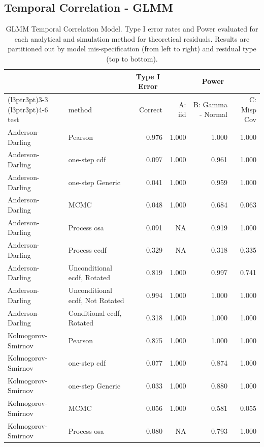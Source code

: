 \documentclass[
]{article}
\begin{document}
\subsection{Temporal Correlation -
GLMM}\label{temporal-correlation---glmm}

\begin{table}[H]
\centering
\caption{\label{tab:randomwalk-results-glmm-theor}GLMM Temporal Correlation Model. Type I error rates and Power evaluated for each analytical and simulation method for theoretical residuals. Results are partitioned out by model mis-specification (from left to right) and residual type (top to bottom).}
\centering
\begin{tabular}[t]{llrrrr}
\toprule
\multicolumn{1}{c}{ } & \multicolumn{1}{c}{ } & \multicolumn{1}{c}{Type I Error} & \multicolumn{3}{c}{Power} \\
\cmidrule(l{3pt}r{3pt}){3-3} \cmidrule(l{3pt}r{3pt}){4-6}
test & method & Correct & A: iid & B: Gamma - Normal & C: Misp Cov\\
\midrule
Anderson-Darling & Pearson & 0.976 & 1.000 & 1.000 & 1.000\\
Anderson-Darling & one-step cdf & 0.097 & 1.000 & 0.961 & 1.000\\
Anderson-Darling & one-step Generic & 0.041 & 1.000 & 0.959 & 1.000\\
Anderson-Darling & MCMC & 0.048 & 1.000 & 0.684 & 0.063\\
Anderson-Darling & Process osa & 0.091 & NA & 0.919 & 1.000\\
\addlinespace
Anderson-Darling & Process ecdf & 0.329 & NA & 0.318 & 0.335\\
Anderson-Darling & Unconditional ecdf, Rotated & 0.819 & 1.000 & 0.997 & 0.741\\
Anderson-Darling & Unconditional ecdf, Not Rotated & 0.994 & 1.000 & 1.000 & 1.000\\
Anderson-Darling & Conditional ecdf, Rotated & 0.318 & 1.000 & 1.000 & 1.000\\
Kolmogorov- Smirnov & Pearson & 0.875 & 1.000 & 1.000 & 1.000\\
\addlinespace
Kolmogorov- Smirnov & one-step cdf & 0.077 & 1.000 & 0.874 & 1.000\\
Kolmogorov- Smirnov & one-step Generic & 0.033 & 1.000 & 0.880 & 1.000\\
Kolmogorov- Smirnov & MCMC & 0.056 & 1.000 & 0.581 & 0.055\\
Kolmogorov- Smirnov & Process osa & 0.080 & NA & 0.793 & 1.000\\

\end{tabular}
\end{table}
\end{document}
